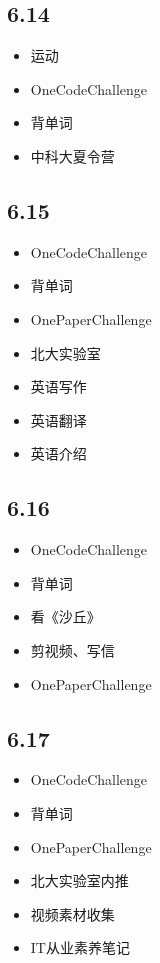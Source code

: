 \documentclass[UTF8]{ctexart}
\begin{document}
\subsection*{6.14}
\begin{itemize}
    \item 运动
    \item OneCodeChallenge
    \item 背单词
    \item 中科大夏令营
\end{itemize}

\subsection*{6.15}
\begin{itemize}
    \item OneCodeChallenge
    \item 背单词
    \item OnePaperChallenge
    \item 北大实验室
    \item 英语写作
    \item 英语翻译
    \item 英语介绍
\end{itemize}

\subsection*{6.16}
\begin{itemize}
    \item OneCodeChallenge
    \item 背单词
    \item 看《沙丘》
    \item 剪视频、写信
    \item OnePaperChallenge
\end{itemize}

\subsection*{6.17}
\begin{itemize}
    \item OneCodeChallenge
    \item 背单词
    \item OnePaperChallenge
    \item 北大实验室内推
    \item 视频素材收集
    \item IT从业素养笔记
\end{itemize}
\end{document}
